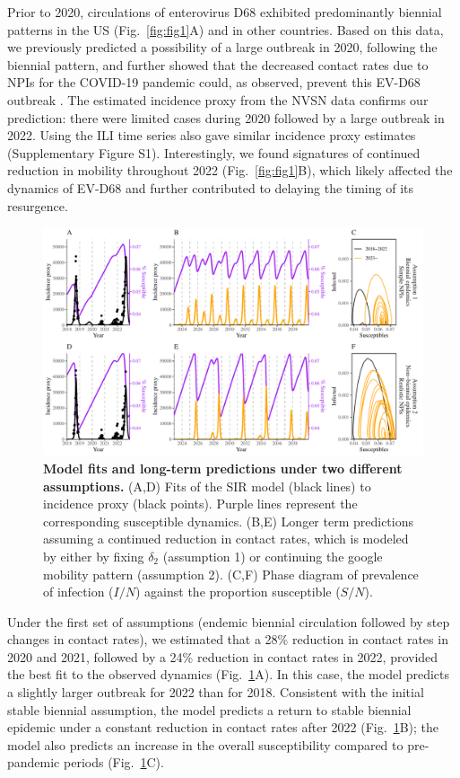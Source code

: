 \documentclass[12pt]{article}
\newcommand{\fref}[1]{Fig.~\ref{fig:#1}}
\begin{document}
Prior to 2020, circulations of enterovirus D68 exhibited predominantly biennial patterns in the US (\fref{fig1}A) and in other countries.
Based on this data, we previously predicted a possibility of a large outbreak in 2020, following the biennial pattern, and further showed that the decreased contact rates due to NPIs for the COVID-19 pandemic could, as observed, prevent this EV-D68 outbreak \citep{park2021epidemiological}.
The estimated incidence proxy from the NVSN data \citep{ma2022increase} confirms our prediction: there were limited cases during 2020 followed by a large outbreak in 2022.
Using the ILI time series also gave similar incidence proxy estimates (Supplementary Figure S1).
Interestingly, we found signatures of continued reduction in mobility throughout 2022 (\fref{fig1}B), which likely affected the dynamics of EV-D68 and further contributed to delaying the timing of its resurgence.

\begin{figure}[!th]
\includegraphics[width=\textwidth]{../figure_pub/figure2.pdf}
\caption{
\textbf{Model fits and long-term predictions under two different assumptions.}
(A,D) Fits of the SIR model (black lines) to incidence proxy (black points).
Purple lines represent the corresponding susceptible dynamics.
(B,E) Longer term predictions assuming a continued reduction in contact rates, which is modeled by either by fixing $\delta_2$ (assumption 1) or continuing the google mobility pattern (assumption 2).
(C,F) Phase diagram of prevalence of infection ($I/N$) against the proportion susceptible ($S/N$).
}
\label{fig:fig2}
\end{figure}

Under the first set of assumptions (endemic biennial circulation followed by step changes in contact rates), we estimated that a 28\% reduction in contact rates in 2020 and 2021, followed by a 24\% reduction in contact rates in 2022, provided the best fit to the observed dynamics (\fref{fig2}A).
In this case, the model predicts a slightly larger outbreak for 2022 than for 2018.
Consistent with the initial stable biennial assumption, the model predicts a return to stable biennial epidemic under a constant reduction in contact rates after 2022 (\fref{fig2}B);
the model also predicts an increase in the overall susceptibility compared to pre-pandemic periods (\fref{fig2}C).
\end{document}
